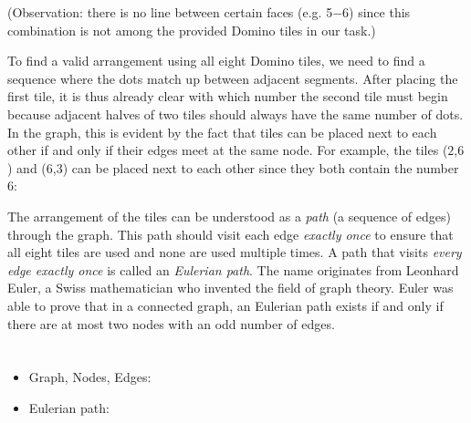 {{(Observation: there is no line between certain faces (e.g. 5$-6$) since this combination is not among the provided Domino tiles in our task.)

To find a valid arrangement using all eight Domino tiles, we need to find a sequence where the dots match up between adjacent segments. After placing the first tile, it is thus already clear with which number the second tile must begin because adjacent halves of two tiles should always have the same number of dots. In the graph, this is evident by the fact that tiles can be placed next to each other if and only if their edges meet at the same node. For example, the tiles ($2$,$6$) and ($6$,$3$) can be placed next to each other since they both contain the number $6$:

{\centering%
\par}

The arrangement of the tiles can be understood as a \emph{path} (a sequence of edges) through the graph. This path should visit each edge \emph{exactly once} to ensure that all eight tiles are used and none are used multiple times. A path that visits \emph{every edge exactly once} is called an \emph{Eulerian path}. The name originates from Leonhard Euler, a Swiss mathematician who invented the field of graph theory. Euler was able to prove that in a connected graph, an Eulerian path exists if and only if there are at most two nodes with an odd number of edges.



\section*{\BrochureWebsitesAndKeywords}
{\raggedright
\begin{itemize}
  \item Graph, Nodes, Edges: \href{https://en.wikipedia.org/wiki/Graph_(abstract_data_type)}{}
  \item Eulerian path: \href{https://en.wikipedia.org/wiki/Eulerian_path}{}
\end{itemize}


}

}{}

\def\AuthorStaubJ{} %
\def\AuthorChothiaZ{} %
\def\AuthorDatzkoThutS{} %
\def\AuthorEscherleN{} %

\newpage}{}
